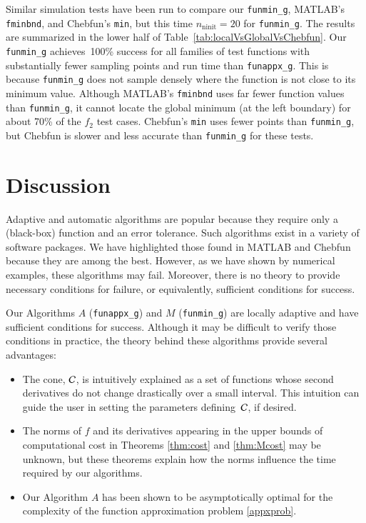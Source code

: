 \documentclass[review]{elsarticle}
\theoremstyle{definition}
\DeclareMathOperator{\ninit}{ninit}
\newcommand{\funappxg}{\texttt{funappx\_g}\xspace}
\newcommand{\funming}{\texttt{funmin\_g}\xspace}
\newcommand{\fminbnd}{\texttt{fminbnd}\xspace}
\begin{document}
Similar simulation tests have been run to compare our \funming, MATLAB's \fminbnd, and
Chebfun's \texttt{min}, but this time $n_{\ninit} = 20$ for \funming. The results are
summarized in the lower half of
Table~\ref{tab:localVsGlobalVsChebfun}. Our \funming{} achieves~100\%
success for all families of test functions with substantially fewer sampling
points and run time than \funappxg. This is because \funming does not 
sample densely where the function is not close to its minimum value. Although MATLAB's
\fminbnd uses far fewer function values than \funming, it cannot locate the
global minimum (at the left boundary) for about 70\% of the $f_2$ test cases.
Chebfun's {\tt min} uses fewer points than \funming, but Chebfun is slower and
less accurate than \funming for these tests.






\section{Discussion}

Adaptive and automatic algorithms are popular because they require only a
(black-box) function and an error tolerance. Such algorithms exist in a
variety of software packages. We have highlighted those found in MATLAB and 
Chebfun  because they are among the best. However, as we have shown
by numerical examples, these algorithms may fail. Moreover,
there is no theory to provide necessary conditions for failure, or equivalently,
sufficient conditions for success.

Our Algorithms $A$ (\funappxg) and $M$ (\funming) are locally adaptive and have
sufficient conditions for success. Although it may be difficult to
verify those conditions in practice, the theory behind these algorithms provide
several advantages:
\begin{itemize}
	
\item The cone, $\mathcal{C}$, is intuitively explained as a set of functions whose  second
derivatives do not change drastically over a small interval.
This intuition can guide the user in setting the parameters defining~$\mathcal{C}$, if
 desired.
	
\item The norms of $f$ and its derivatives appearing in the upper bounds of computational cost
in Theorems \ref{thm:cost} and \ref{thm:Mcost} may be unknown, but
these theorems explain how the norms influence the time required by
our algorithms.
	
\item Our Algorithm $A$ has been shown to be asymptotically optimal for the
complexity of the function approximation problem \eqref{appxprob}.
	
\end{itemize}
\end{document}
